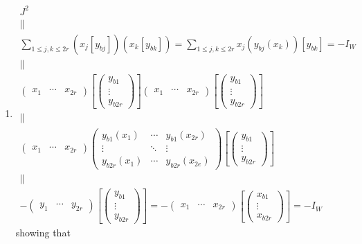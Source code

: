 \documentclass[aps,preprint]{revtex4}
\begin{document}
\begin{enumerate}
\item 
\begin{gather}
J^{2} \\
\parallel \\
\sum_{1\leq j,k\leq 2r}\left( \overset{}{x_{j}\left[ y_{bj}\right] }\right)
\left( \overset{}{x_{k}\left[ y_{bk}\right] }\right) =\sum_{1\leq j,k\leq
2r}x_{j}\left( \overset{}{y_{bj}\left( x_{k}\right) }\right) \left[ y_{bk}%
\right] =-I_{W} \\
\parallel \\
\left( 
\begin{array}{ccc}
x_{1} & \cdots & x_{2r}%
\end{array}%
\right) \left[ \left( 
\begin{array}{c}
y_{b1} \\ 
\vdots \\ 
y_{b2r}%
\end{array}%
\right) \right] \left( 
\begin{array}{ccc}
x_{1} & \cdots & x_{2r}%
\end{array}%
\right) \left[ \left( 
\begin{array}{c}
y_{b1} \\ 
\vdots \\ 
y_{b2r}%
\end{array}%
\right) \right] \\
\parallel \\
\left( 
\begin{array}{ccc}
x_{1} & \cdots & x_{2r}%
\end{array}%
\right) \left( 
\begin{array}{ccc}
y_{b1}\left( x_{1}\right) & \cdots & y_{b1}\left( x_{2r}\right) \\ 
\vdots & \ddots & \vdots \\ 
y_{b2r}\left( x_{1}\right) & \cdots & y_{b2r}\left( x_{2e}\right)%
\end{array}%
\right) \left[ \left( 
\begin{array}{c}
y_{b1} \\ 
\vdots \\ 
y_{b2r}%
\end{array}%
\right) \right] \\
\parallel \\
-\left( 
\begin{array}{ccc}
y_{1} & \cdots & y_{2r}%
\end{array}%
\right) \left[ \left( 
\begin{array}{c}
y_{b1} \\ 
\vdots \\ 
y_{b2r}%
\end{array}%
\right) \right] =-\left( 
\begin{array}{ccc}
x_{1} & \cdots & x_{2r}%
\end{array}%
\right) \left[ \left( 
\begin{array}{c}
x_{b1} \\ 
\vdots \\ 
x_{b2r}%
\end{array}%
\right) \right] =-I_{W}
\end{gather}%
showing that


\end{enumerate}
\end{document}

